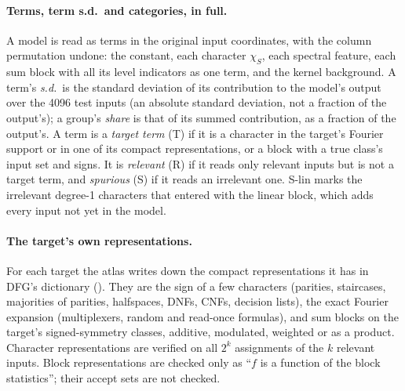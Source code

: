 \paragraph{Terms, term s.d.\ and categories, in full.} A model is read as terms in the original input coordinates, with the column permutation undone: the constant, each character $\chi_S$, each spectral feature, each sum block with all its level indicators as one term, and the kernel background. A term's \emph{s.d.}\ is the standard deviation of its contribution to the model's output over the 4096 test inputs (an absolute standard deviation, not a fraction of the output's); a group's \emph{share} is that of its summed contribution, as a fraction of the output's. A term is a \emph{target term} (T) if it is a character in the target's Fourier support or in one of its compact representations, or a block with a true class's input set and signs. It is \emph{relevant} (R) if it reads only relevant inputs but is not a target term, and \emph{spurious} (S) if it reads an irrelevant one. S-lin marks the irrelevant degree-1 characters that entered with the linear block, which adds every input not yet in the model.

\paragraph{The target's own representations.} For each target the atlas writes down the compact representations it has in DFG's dictionary (). They are the sign of a few characters (parities, staircases, majorities of parities, halfspaces, DNFs, CNFs, decision lists), the exact Fourier expansion (multiplexers, random and read-once formulas), and sum blocks on the target's signed-symmetry classes, additive, modulated, weighted or as a product. Character representations are verified on all $2^k$ assignments of the $k$ relevant inputs. Block representations are checked only as ``$f$ is a function of the block statistics''; their accept sets are not checked.

